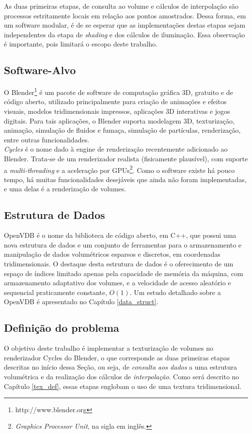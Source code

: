 As duas primeiras etapas, de consulta ao volume e cálculos de interpolação são processos estritamente locais em relação aos pontos amostrados. Dessa forma, em um software modular, é de se esperar que as implementações destas etapas sejam independentes da etapa de \emph{shading} e dos cálculos de iluminação. Essa observação é importante, pois limitará o escopo deste trabalho.

\subsection*{Software-Alvo}
O Blender\footnote{http://www.blender.org} é um pacote de software de computação gráfica 3D, gratuito e de código aberto, utilizado principalmente para criação de animações e efeitos visuais, modelos tridimensionais impressos, aplicações 3D interativas e jogos digitais. Para tais aplicações, o Blender suporta modelagem 3D, texturização, animação, simulação de fluidos e fumaça, simulação de partículas, renderização, entre outras funcionalidades. \\

\emph{Cycles} é o nome dado à engine de renderização recentemente adicionado ao Blender. Trata-se de um renderizador realista (fisicamente plausível), com suporte a \emph{multi-threading} e a aceleração por GPUs\footnote{\emph{Graphics Processor Unit}, na sigla em inglês.}. Como o software existe há pouco tempo, há muitas funcionalidades desejáveis que ainda não foram implementadas, e uma delas é a renderização de volumes.

\subsection*{Estrutura de Dados}
OpenVDB é o nome da biblioteca de código aberto, em C++, que possui uma nova estrutura de dados e um conjunto de ferramentas para o armazenamento e manipulação de dados volumétricos esparsos e discretos, em coordenadas tridimensionais. O destaque desta estrutura de dados é o oferecimento de um espaço de índices limitado apenas pela capacidade de memória da máquina, com armazenamento adaptativo dos volumes, e a velocidade de acesso aleatório e sequencial praticamente constante, $O(1)$. Um estudo detalhado sobre a OpenVDB é apresentado no Capítulo \ref{data_struct}.

\subsection*{Definição do problema}
O objetivo deste trabalho é implementar a texturização de volumes no renderizador Cycles do Blender, o que corresponde as duas primeiras etapas descritas no início dessa Seção, ou seja, de \emph{consulta aos dados} a uma estrutura volumétrica e da realização dos cálculos de \emph{interpolação}. Como será descrito no Capítulo \ref{tex_def}, essas etapas englobam o uso de uma textura tridimensional.\\

